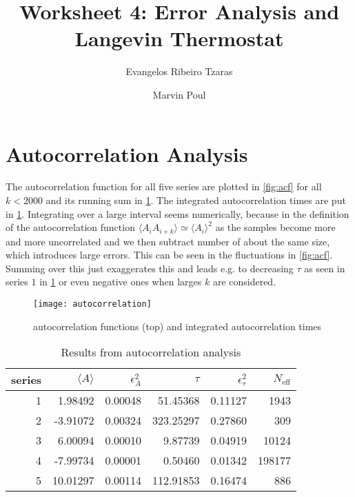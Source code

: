 \documentclass[a4paper,11pt,bibtotoc]{scrartcl}
\title{Worksheet 4: Error Analysis and Langevin Thermostat}
\author{Evangelos Ribeiro Tzaras \and Marvin Poul}
\begin{document}
\maketitle

\section{Autocorrelation Analysis}

The autocorrelation function for all five series are plotted in \cref{fig:acf}
for all $k < 2000$ and its running sum in \cref{fig:iat}. The
integrated autocorrelation times are put in \cref{tab:auto}. Integrating over
a large interval seems numerically, because in the definition of the
autocorrelation function $\langle A_iA_{i + k}\rangle \simeq \langle A_i\rangle^2$ as the samples become
more and more uncorrelated and we then subtract number of about the same size, which
introduces large errors. This can be seen in the fluctuations in
\cref{fig:acf}. Summing over this just exaggerates this and leads e.g. to
decreasing $\tau$ as seen in series $1$ in \cref{fig:iat} or even negative ones
when larges $k$ are considered.

\begin{figure}[h]
    \centering
    \texttt{[image: autocorrelation]}
    \caption{autocorrelation functions (top) and integrated autocorrelation
    times}
    \label{fig:acf}
    \label{fig:iat}
\end{figure}

\begin{table}
    \centering
    \caption{Results from autocorrelation analysis}
    \label{tab:auto}
    \begin{tabular}{rrrrrr}
        \toprule
    series &  $\langle A \rangle$ &  $\epsilon_A^2$ &  $\tau$ &  $\epsilon_\tau^2$ &  $N_\mathrm{eff}$ \\
    \midrule
    1 & 1.98492 & 0.00048 & 51.45368 & 0.11127 & 1943 \\
    2 & -3.91072 & 0.00324 & 323.25297 & 0.27860 & 309 \\
    3 & 6.00094 & 0.00010 & 9.87739 & 0.04919 & 10124 \\
    4 & -7.99734 & 0.00001 & 0.50460 & 0.01342 & 198177 \\
    5 & 10.01297 & 0.00114 & 112.91853 & 0.16474 & 886 \\
    \bottomrule
    \end{tabular}
\end{table}
\end{document}
